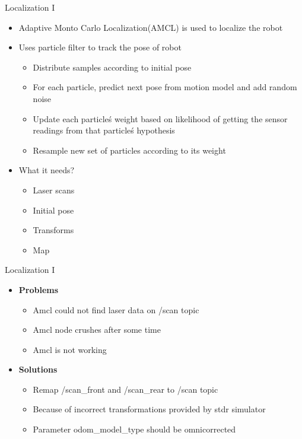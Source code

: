 \begin{frame}{Localization I}
    \begin{itemize}
        \item Adaptive Monto Carlo Localization(AMCL) is used to localize the robot
        \item Uses particle filter to track the pose of robot
        \begin{itemize}
          \item Distribute samples according to initial pose
          \item For each particle, predict next pose from motion model and add random noise
          \item Update each particle\'s weight based on 
likelihood of getting the sensor readings from
that particle\'s hypothesis
          \item Resample new set of particles according to its weight	
        \end{itemize}
        \item What it needs?
        \begin{itemize}
            \item Laser scans
            \item Initial pose
            \item Transforms
            \item Map 
        \end{itemize}
    \end{itemize}
\end{frame}
\begin{frame}{Localization I}
\begin{itemize}
	\item \textbf{Problems}
	\begin{itemize}
		\item Amcl could not find laser data on /scan topic
		\item Amcl node crushes after some time
		\item Amcl is not working
	\end{itemize}
	\item \textbf{Solutions}
	\begin{itemize}
		\item Remap /scan\_front and /scan\_rear to /scan topic
		\item Because of incorrect transformations provided by stdr simulator
		\item Parameter odom\_model\_type should be omni\-corrected
	\end{itemize}
\end{itemize}
\end{frame}